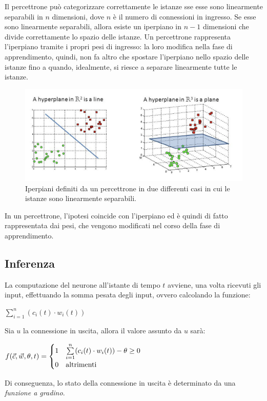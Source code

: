 Il percettrone può categorizzare correttamente le istanze sse esse sono linearmente separabili in $n$ dimensioni, dove $n$ è il numero di connessioni in ingresso. Se esse sono linearmente separabili, allora esiste un iperpiano in $n-1$ dimensioni che divide correttamente lo spazio delle istanze.
Un percettrone rappresenta l'iperpiano tramite i propri  pesi di ingresso: la loro modifica nella fase di apprendimento, quindi, non fa altro che spostare l'iperpiano nello spazio delle istanze fino a quando, idealmente, si riesce a separare linearmente tutte le istanze.
\begin{figure}[ht]
    \centering
    \includegraphics[width=1\linewidth]{img/hyperplane_perceptron.png}
    \caption{Iperpiani definiti da un percettrone in due differenti casi in cui le istanze sono linearmente separabili.}
    \label{fig:hyperplane_perceptron}
\end{figure}
In un percettrone, l'ipotesi coincide con l'iperpiano ed è quindi di fatto rappresentata dai pesi, che vengono modificati nel corso della fase di apprendimento.

\subsection{Inferenza}
La computazione del neurone all'istante di tempo $t$ avviene, una volta ricevuti gli input, effettuando la somma pesata degli input, ovvero calcolando la funzione:
\begin{center}
    $\sum\limits_{i = 1}^{n} (c_i(t) \cdot w_i(t))$
\end{center}
Sia $u$ la connessione in uscita, allora il valore assunto da $u$ sarà:
\begin{center}
    $f(\Vec{c}, \Vec{w}, \theta, t) = \begin{cases}
        1 & \sum\limits_{i = 1}^{n} (c_i(t) \cdot w_i(t)) - \theta \ge 0 \\
        0 & \textnormal{altrimenti}
    \end{cases}$
\end{center}
Di conseguenza, lo stato della connessione in uscita è determinato da una \textit{funzione a gradino}.

